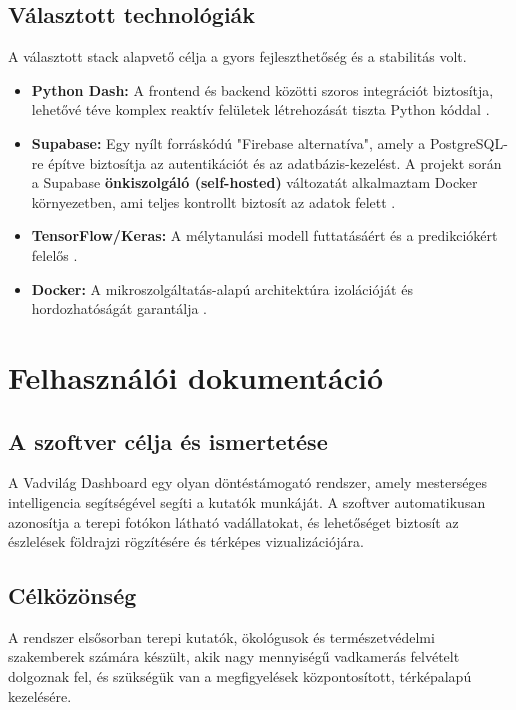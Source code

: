 \documentclass[
	parspace, %
]{elteikthesis}[2024/04/26]
\begin{document}
\section{Választott technológiák}
A választott stack alapvető célja a gyors fejleszthetőség és a stabilitás volt.
\begin{itemize}
    \item \textbf{Python Dash:} A frontend és backend közötti szoros integrációt biztosítja, lehetővé téve komplex reaktív felületek létrehozását tiszta Python kóddal \cite{dash_docs}.
    \item \textbf{Supabase:} Egy nyílt forráskódú "Firebase alternatíva", amely a PostgreSQL-re építve biztosítja az autentikációt és az adatbázis-kezelést. A projekt során a Supabase \textbf{önkiszolgáló (self-hosted)} változatát alkalmaztam Docker környezetben, ami teljes kontrollt biztosít az adatok felett \cite{supabase_docs}.
    \item \textbf{TensorFlow/Keras:} A mélytanulási modell futtatásáért és a predikciókért felelős \cite{tensorflow_docs}.
    \item \textbf{Docker:} A mikroszolgáltatás-alapú architektúra izolációját és hordozhatóságát garantálja \cite{docker_docs}.
\end{itemize}

\chapter{Felhasználói dokumentáció}
\label{ch:user}

\section{A szoftver célja és ismertetése}
A Vadvilág Dashboard egy olyan döntéstámogató rendszer, amely mesterséges intelligencia segítségével segíti a kutatók munkáját. A szoftver automatikusan azonosítja a terepi fotókon látható vadállatokat, és lehetőséget biztosít az észlelések földrajzi rögzítésére és térképes vizualizációjára.

\section{Célközönség}
A rendszer elsősorban terepi kutatók, ökológusok és természetvédelmi szakemberek számára készült, akik nagy mennyiségű vadkamerás felvételt dolgoznak fel, és szükségük van a megfigyelések központosított, térképalapú kezelésére.
\end{document}
